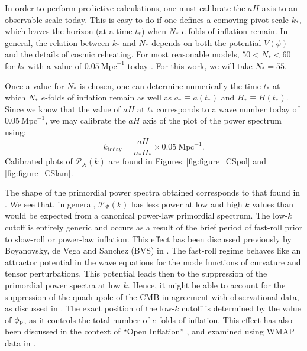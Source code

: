 In order to perform predictive calculations, one must calibrate the $aH$ axis to an observable scale today. This is easy to do if one defines a comoving pivot scale $k_*$, which leaves the horizon (at a time $t_*$) when $N_*$ $e$-folds of inflation remain. In general, the relation between $k_*$ and $N_*$ depends on both the potential $V(\phi)$ and the details of cosmic reheating. For most reasonable models, $50<N_*<60$  for $k_*$ with a value of $0.05\:\mathrm{Mpc}^{-1}$ today \citep{planck_collaboration_planck_2013-1}. For this work, we will take $N_*=55$. 

Once a value for $N_*$ is chosen, one can determine numerically the time $t_*$ at which $N_*$ $e$-folds of inflation remain as well as $a_*\equiv a(t_*)$ and $H_*\equiv H(t_*)$. Since we know that the value of $aH$ at $t_*$ corresponds to a wave number today of $0.05\:\mathrm{Mpc}^{-1}$, we may calibrate the $aH$ axis of the plot of the power spectrum using:
%
\begin{equation}
  k_\mathrm{today} 
  = 
  \frac{aH}{a_*H_*}\times0.05\:\mathrm{Mpc}^{-1}.
\end{equation}
%
Calibrated plots of $\mathcal{P}_\mathcal{R}(k)$ are found in Figures~\ref{fig:figure_CSpol} and \nolinebreak\ref{fig:figure_CSlam}. 



The shape of the primordial power spectra obtained corresponds to that found in \citep{lasenby_closed_2003}. We see that, in general, $\mathcal{P}_\mathcal{R}(k)$ has less power at low and high $k$ values than would be expected from a canonical power-law primordial spectrum.  The low-$k$ cutoff is entirely generic and occurs as a result of the brief period of fast-roll prior to slow-roll or power-law inflation.  This effect has been discussed previously by Boyanovsky, de Vega and Sanchez (BVS) in \citep{boyanovsky_cmb_2006}. The fast-roll regime behaves like an attractor potential in the wave equations for the mode functions of curvature and tensor perturbations. This potential leads then to the suppression of the primordial power spectra at low $k$.  Hence, it might be able to account for the suppression of the quadrupole of the CMB in agreement with observational data, as discussed in \citep{boyanovsky_cmb_2006-1}.  The exact position of the low-$k$ cutoff is determined by the value of $\phi_{\mathrm{p}}$, as it controls the total number of $e$-folds of inflation. This effect has also been discussed in the context of ``Open Inflation'' \citep{Yamauchi_strings_2011,Linde_open_1999,Linde_toy_1999}, and examined using WMAP data in \citet{Contaldi_suppress_2003}.

